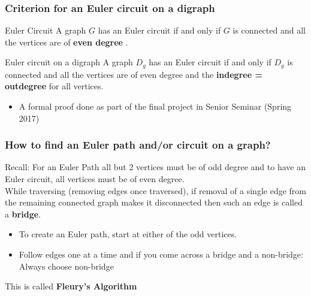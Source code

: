 \documentclass{beamer}
\begin{document}

\begin{frame}
\frametitle{Criterion for an Euler circuit on a digraph}
\begin{block}{Euler Circuit}
A graph $G$ has an Euler circuit if and only if $G$ is connected and all the vertices are of \textbf{even degree} . 
\end{block}
\begin{block}{Euler circuit on a digraph}
A graph $D_g$ has an Euler circuit if and only if $D_g$ is connected and all the vertices are of even degree and the \textbf{indegree = outdegree}
for all vertices.
\end{block}
\begin{itemize}
\item A formal proof done as part of the final project in Senior Seminar (Spring 2017)
\end{itemize}
\end{frame}


\begin{frame}
\frametitle{How to find an Euler path and/or circuit on a graph?}
Recall: For an Euler Path all but 2 vertices must be of odd degree and to have an Euler circuit, all vertices must be of even degree.
\pause
\\  While traversing (removing edges once traversed), if removal of a single edge from the remaining connected graph makes it disconnected then such an edge is called a \textbf{bridge}.

\begin{itemize}

\item To create an Euler path, start at either of the odd vertices.
\pause
\item Follow edges one at a time and if you come across a bridge and a non-bridge: Always choose non-bridge
\end{itemize}
\pause
This is called \textbf{Fleury's Algorithm}
\end{frame}

\end{document}
